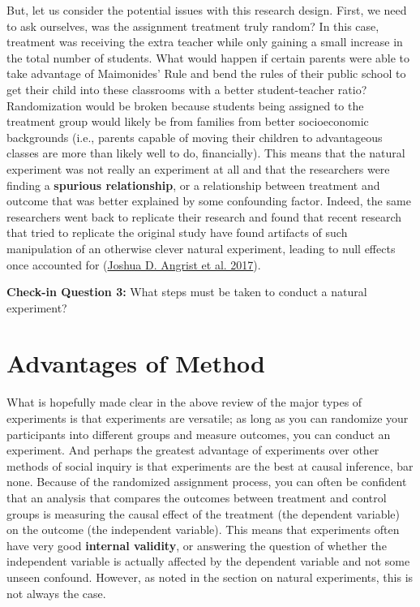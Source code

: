\documentclass{book}
\newenvironment{shaded*}{
    \begin{center}
    \begin{tabular}{|p{0.9\textwidth}|}
    \hline\\
    }
    { 
    \\\\\hline
    \end{tabular} 
    \end{center}
}
\begin{document}
But, let us consider the potential issues with this research design. First, we
need to ask ourselves, was the assignment treatment truly random? In this
case, treatment was receiving the extra teacher while only gaining a small
increase in the total number of students. What would happen if certain parents
were able to take advantage of Maimonides' Rule and bend the rules of their
public school to get their child into these classrooms with a better
student-teacher ratio? Randomization would be broken because students being
assigned to the treatment group would likely be from families from better
socioeconomic backgrounds (i.e., parents capable of moving their children to
advantageous classes are more than likely well to do, financially). This means
that the natural experiment was not really an experiment at all and that the
researchers were finding a \textbf{spurious relationship}, or a relationship
between treatment and outcome that was better explained by some confounding
factor. Indeed, the same researchers went back to replicate their research and
found that recent research that tried to replicate the original study have
found artifacts of such manipulation of an otherwise clever natural
experiment, leading to null effects once accounted for
(\protect\hyperlink{ref-angrist_maimonides_2017}{Joshua D. Angrist et al.
2017}).

\begin{shaded*}

\textbf{Check-in Question 3:} What steps must be taken to conduct a natural
experiment?

\end{shaded*}

\hypertarget{advantages-of-method-1}{%
\section{Advantages of Method}\label{advantages-of-method-1}}

What is hopefully made clear in the above review of the major types of
experiments is that experiments are versatile; as long as you can randomize
your participants into different groups and measure outcomes, you can conduct
an experiment. And perhaps the greatest advantage of experiments over other
methods of social inquiry is that experiments are the best at causal
inference, bar none. Because of the randomized assignment process, you can
often be confident that an analysis that compares the outcomes between
treatment and control groups is measuring the causal effect of the treatment
(the dependent variable) on the outcome (the independent variable). This means
that experiments often have very good \textbf{internal validity}, or answering
the question of whether the independent variable is actually affected by the
dependent variable and not some unseen confound. However, as noted in the
section on natural experiments, this is not always the case.
\end{document}
